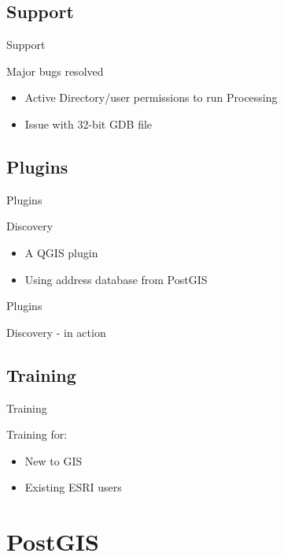 \subsection{Support}
\begin{frame}{Support}
	\begin{block}{Major bugs resolved}
		\begin{itemize}
			\item Active Directory/user permissions to run Processing
			\item Issue with 32-bit GDB file
		\end{itemize}
	\end{block}
	
\end{frame}

\subsection{Plugins}
\begin{frame}{Plugins}
	\begin{block}{Discovery}
		\begin{itemize}
			\item A QGIS plugin
			\item Using address database from PostGIS
		\end{itemize}
	\end{block}
	
\end{frame}

\begin{frame}{Plugins}
	\begin{block}{Discovery - in action}
\end{block}	
\end{frame}

\subsection{Training}
\begin{frame}{Training}
	\begin{block}{Training for:}
		\begin{itemize}
			\item New to GIS
			\item Existing ESRI users
		\end{itemize}
	\end{block}	
\end{frame}



\section{PostGIS}

